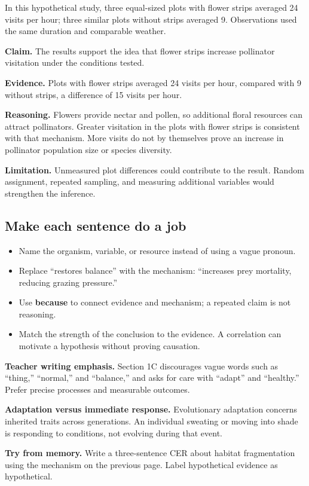 \documentclass[11pt,letterpaper]{article}
\newcommand{\memorycheck}[1]{\par\smallskip\textbf{Try from memory.} #1\par}
\begin{document}
In this hypothetical study, three equal-sized plots with flower strips averaged 24 visits per hour; three similar plots without strips averaged 9. Observations used the same duration and comparable weather.

\textbf{Claim.} The results support the idea that flower strips increase pollinator visitation under the conditions tested.

\textbf{Evidence.} Plots with flower strips averaged 24 visits per hour, compared with 9 without strips, a difference of 15 visits per hour.

\textbf{Reasoning.} Flowers provide nectar and pollen, so additional floral resources can attract pollinators. Greater visitation in the plots with flower strips is consistent with that mechanism. More visits do not by themselves prove an increase in pollinator population size or species diversity.

\textbf{Limitation.} Unmeasured plot differences could contribute to the result. Random assignment, repeated sampling, and measuring additional variables would strengthen the inference.
\subsection*{Make each sentence do a job}
\begin{itemize}
\item Name the organism, variable, or resource instead of using a vague pronoun.
\item Replace ``restores balance'' with the mechanism: ``increases prey mortality, reducing grazing pressure.''
\item Use \textbf{because} to connect evidence and mechanism; a repeated claim is not reasoning.
\item Match the strength of the conclusion to the evidence. A correlation can motivate a hypothesis without proving causation.
\end{itemize}
\textbf{Teacher writing emphasis.} Section 1C discourages vague words such as ``thing,'' ``normal,'' and ``balance,'' and asks for care with ``adapt'' and ``healthy.'' Prefer precise processes and measurable outcomes.

\textbf{Adaptation versus immediate response.} Evolutionary adaptation concerns inherited traits across generations. An individual sweating or moving into shade is responding to conditions, not evolving during that event.
\memorycheck{Write a three-sentence CER about habitat fragmentation using the mechanism on the previous page. Label hypothetical evidence as hypothetical.}
\end{document}
